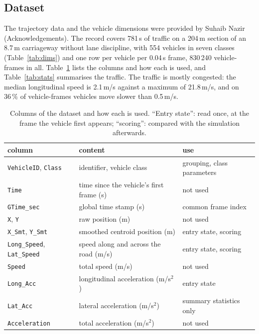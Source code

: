 \documentclass[11pt]{article}
\begin{document}
\subsection{Dataset}
The trajectory data and the vehicle dimensions were provided by Suhaib Nazir
(Acknowledgements). The record covers 781\,s of traffic on a 204\,m section of
an 8.7\,m carriageway without lane discipline, with 554 vehicles in seven
classes (Table~\ref{tab:dims}) and one row per vehicle per 0.04\,s frame,
830\,240 vehicle-frames in all. Table~\ref{tab:cols} lists the columns and how
each is used, and Table~\ref{tab:stats} summarises the traffic. The traffic is
mostly congested: the median longitudinal speed is 2.1\,m/s against a maximum of
21.8\,m/s, and on $36\,\%$ of vehicle-frames vehicles move slower than 0.5\,m/s.

\begin{table}[H]\centering\footnotesize
\caption{Columns of the dataset and how each is used. ``Entry state'': read
once, at the frame the vehicle first appears; ``scoring'': compared with the
simulation afterwards.}
\label{tab:cols}
\begin{tabular}{@{}lll@{}}
\toprule
column & content & use\\
\midrule
\texttt{VehicleID}, \texttt{Class} & identifier, vehicle class & grouping, class parameters\\
\texttt{Time} & time since the vehicle's first frame (s) & not used\\
\texttt{GTime\_sec} & global time stamp (s) & common frame index\\
\texttt{X}, \texttt{Y} & raw position (m) & not used\\
\texttt{X\_Smt}, \texttt{Y\_Smt} & smoothed centroid position (m) & entry state, scoring\\
\texttt{Long\_Speed}, \texttt{Lat\_Speed} & speed along and across the road (m/s) & entry state, scoring\\
\texttt{Speed} & total speed (m/s) & not used\\
\texttt{Long\_Acc} & longitudinal acceleration (m/s$^2$) & entry state\\
\texttt{Lat\_Acc} & lateral acceleration (m/s$^2$) & summary statistics only\\
\texttt{Acceleration} & total acceleration (m/s$^2$) & not used\\
\bottomrule
\end{tabular}
\end{table}
\end{document}
